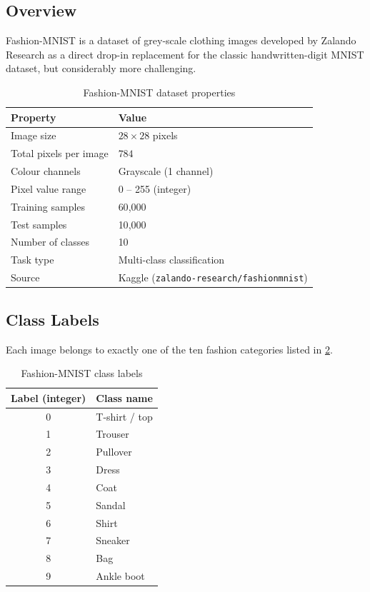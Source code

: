 \documentclass[12pt,a4paper]{article}
\begin{document}
\subsection{Overview}
\label{subsec:fashionmnist-overview}

Fashion-MNIST is a dataset of grey-scale clothing images developed by Zalando
Research as a direct drop-in replacement for the classic handwritten-digit
MNIST dataset, but considerably more challenging.

\begin{table}[htbp]
  \centering
  \caption{Fashion-MNIST dataset properties}
  \label{tab:fashionmnist}
  \begin{tabular}{ll}
    \toprule
    \textbf{Property} & \textbf{Value} \\
    \midrule
    Image size          & $28 \times 28$ pixels \\
    Total pixels per image & $784$ \\
    Colour channels     & Grayscale (1 channel) \\
    Pixel value range   & 0 -- 255 (integer) \\
    Training samples    & 60{,}000 \\
    Test samples        & 10{,}000 \\
    Number of classes   & 10 \\
    Task type           & Multi-class classification \\
    Source              & Kaggle (\texttt{zalando-research/fashionmnist}) \\
    \bottomrule
  \end{tabular}
\end{table}

\subsection{Class Labels}
\label{subsec:class-labels}

Each image belongs to exactly one of the ten fashion categories listed in
\cref{tab:classes}.

\begin{table}[htbp]
  \centering
  \caption{Fashion-MNIST class labels}
  \label{tab:classes}
  \begin{tabular}{cl}
    \toprule
    \textbf{Label (integer)} & \textbf{Class name} \\
    \midrule
    0 & T-shirt / top \\
    1 & Trouser \\
    2 & Pullover \\
    3 & Dress \\
    4 & Coat \\
    5 & Sandal \\
    6 & Shirt \\
    7 & Sneaker \\
    8 & Bag \\
    9 & Ankle boot \\
    \bottomrule
  \end{tabular}
\end{table}
\end{document}
